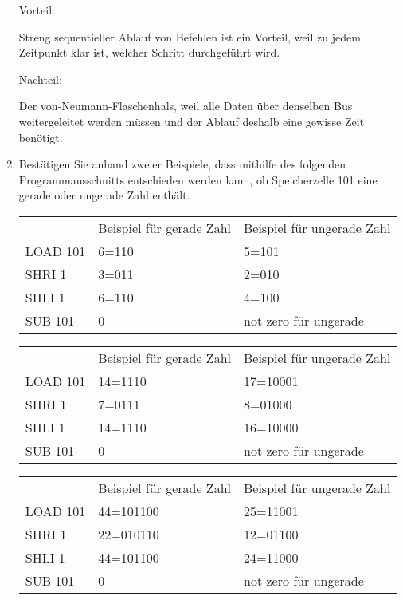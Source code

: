 \documentclass{lehramt-informatik-aufgabe}
\begin{document}
\begin{enumerate}
\begin{liAntwort}
Vorteil:

Streng sequentieller Ablauf von Befehlen ist ein Vorteil, weil zu jedem
Zeitpunkt klar ist, welcher Schritt durchgeführt wird.

Nachteil:

Der von-Neumann-Flaschenhals, weil alle Daten über denselben Bus
weitergeleitet werden müssen und der Ablauf deshalb eine gewisse Zeit
benötigt.
\end{liAntwort}


\item Bestätigen Sie anhand zweier Beispiele, dass mithilfe des
folgenden Programmausschnitts entschieden werden kann, ob
Speicherzelle 101 eine gerade oder ungerade Zahl enthält.

\begin{tabular}{lll}
         & Beispiel für gerade    Zahl & Beispiel für ungerade    Zahl \\
LOAD 101 & 6=110                       & 5=101                         \\
SHRI 1   & 3=011                       & 2=010                         \\
SHLI 1   & 6=110                       & 4=100                         \\
SUB 101  & 0                           & not zero    für ungerade
\end{tabular}

\begin{tabular}{lll}
         & Beispiel für gerade    Zahl & Beispiel für ungerade    Zahl \\
LOAD 101 & 14=1110                     & 17=10001                      \\
SHRI 1   & 7=0111                      & 8=01000                       \\
SHLI 1   & 14=1110                     & 16=10000                      \\
SUB 101  & 0                           & not zero    für ungerade
\end{tabular}

\begin{tabular}{lll}
         & Beispiel für gerade    Zahl & Beispiel für ungerade    Zahl \\
LOAD 101 & 44=101100                   & 25=11001                      \\
SHRI 1   & 22=010110                   & 12=01100                      \\
SHLI 1   & 44=101100                   & 24=11000                      \\
SUB 101  & 0                           & not zero    für ungerade
\end{tabular}


\end{enumerate}
\end{document}

